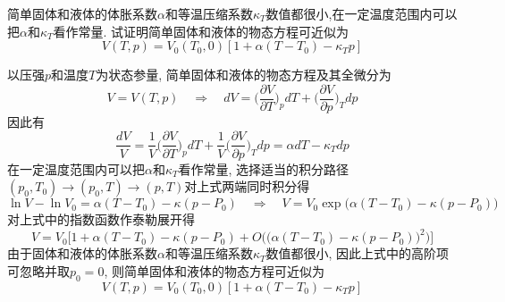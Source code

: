 \begin{problem}[1.4]
简单固体和液体的体胀系数$\alpha$和等温压缩系数$\kappa_T$数值都很小,在一定温度范围内可以把$\alpha$和$\kappa_T$看作常量. 试证明简单固体和液体的物态方程可近似为
\[
V(T,p) = V_0(T_0,0)[1+\alpha(T-T_0)-\kappa_T p]
\]
\end{problem}
\begin{solution}
以压强$p$和温度$T$为状态参量, 简单固体和液体的物态方程及其全微分为
\[
V = V(T,p)
\quad\Longrightarrow\quad 
dV = \bigg(\frac{\partial V}{\partial T}\bigg)_p dT + \bigg(\frac{\partial V}{\partial p}\bigg)_T dp
\]
因此有
\[
\frac{dV}{V} = \frac{1}{V}\bigg(\frac{\partial V}{\partial T}\bigg)_p dT + \frac{1}{V}\bigg(\frac{\partial V}{\partial p}\bigg)_T dp = \alpha dT -\kappa_T dp
\]
在一定温度范围内可以把$\alpha$和$\kappa_T$看作常量, 选择适当的积分路径$(p_0,T_0)\rightarrow(p_0,T)\rightarrow(p,T)$对上式两端同时积分得
\[
\ln V - \ln V_0 = \alpha(T-T_0) - \kappa(p-P_0)
\quad\Longrightarrow\quad 
V = V_0 \exp\Big(\alpha(T-T_0) - \kappa(p-P_0)\Big)
\]
对上式中的指数函数作泰勒展开得
\[
V = V_0 \bigg[1+\alpha(T-T_0) - \kappa(p-P_0)　+　O\Big(\big(\alpha(T-T_0) - \kappa(p-P_0)\big)^2\Big)\bigg]
\]
由于固体和液体的体胀系数$\alpha$和等温压缩系数$\kappa_T$数值都很小, 因此上式中的高阶项可忽略并取$p_0=0$, 则简单固体和液体的物态方程可近似为
\[
V(T,p) = V_0(T_0,0)[1+\alpha(T-T_0)-\kappa_T p]
\]
\end{solution}
